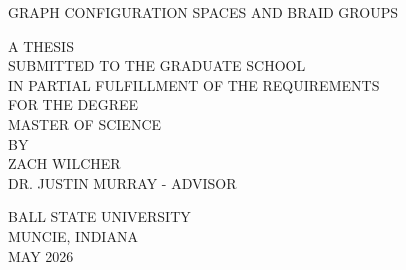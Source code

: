 \begin{titlepage}
   \begin{center}
       \vspace*{\fill}
       {GRAPH CONFIGURATION SPACES AND BRAID GROUPS}
 
       \vspace{1cm}
 
       A THESIS\\
       SUBMITTED TO THE GRADUATE SCHOOL\\
       IN PARTIAL FULFILLMENT OF THE REQUIREMENTS\\
       FOR THE DEGREE\\
       MASTER OF SCIENCE\\
       BY\\
       ZACH WILCHER\\
       DR. JUSTIN MURRAY - ADVISOR
 
       \vspace{1 cm}
 
       BALL STATE UNIVERSITY\\
       MUNCIE, INDIANA\\
       MAY 2026
       \vspace*{\fill}
   \end{center}
\end{titlepage}